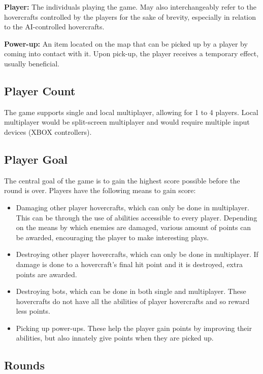 \documentclass{article}
\theoremstyle{definition}
\begin{document}
\textbf{Player:} The individuals playing the game. May also interchangeably
refer to the hovercrafts controlled by the players for the sake of brevity,
especially in relation to the AI-controlled hovercrafts.

\textbf{Power-up:} An item located on the map that can be picked up by a player
by coming into contact with it. Upon pick-up, the player receives a temporary
effect, usually beneficial.

\subsection{Player Count}

The game supports single and local multiplayer, allowing for 1 to 4 players.
Local multiplayer would be split-screen multiplayer and would require multiple
input devices (XBOX controllers).

\subsection{Player Goal}

The central goal of the game is to gain the highest score possible before the
round is over. Players have the following means to gain score:
\begin{itemize}
  \item Damaging other player hovercrafts, which can only be done in
    multiplayer. This can be through the use of abilities accessible to every
    player. Depending on the means by which enemies are damaged, various
    amount of points can be awarded, encouraging the player to make interesting
    plays.
  \item Destroying other player hovercrafts, which can only be done in
    multiplayer. If damage is done to a hovercraft's final hit point and it is
    destroyed, extra points are awarded.
  \item Destroying bots, which can be done in both single and multiplayer.
    These hovercrafts do not have all the abilities of player hovercrafts and
    so reward less points.
  \item Picking up power-ups. These help the player gain points by improving
    their abilities, but also innately give points when they are picked up.
\end{itemize}

\subsection{Rounds}
\end{document}
